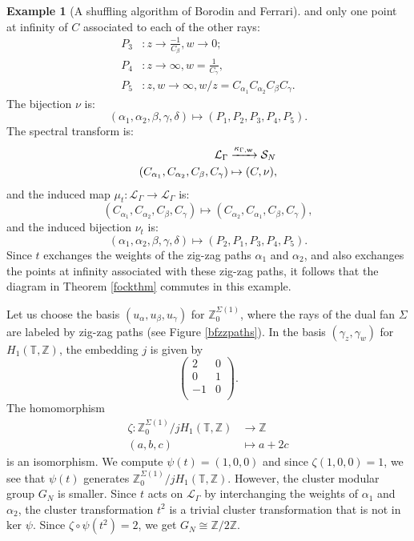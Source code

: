 \documentclass[11pt]{article} %
\theoremstyle{definition}
\newtheorem{example}[theorem]{Example}
\newcommand{\Z}{{\mathbb Z}}
\newcommand{\T}{{\mathbb T}}
\newcommand{\ra}{\rightarrow}
\begin{document}
\begin{example}[A shuffling algorithm of Borodin and Ferrari]
and only one point at infinity of $C$ associated to each of the other rays:
\begin{align*}
P_3 &: z \ra \frac{-1}{C_\beta}, w \ra 0;\\
P_4 &: z \ra \infty, w=\frac{1}{C_{\gamma}},\\
P_5 &: z,w \ra \infty, w/z=C_{\alpha_1} C_{\alpha_2} C_{\beta} C_\gamma.
\end{align*}
The bijection $\nu$ is:
$$
(\alpha_1,\alpha_2,\beta,\gamma,\delta) \mapsto (P_1,P_2,P_3,P_4,P_5).
$$
The spectral transform is:
\begin{align*}
    \mathcal L_\Gamma &\xrightarrow[]{\kappa_{\Gamma, {\bf w}}} \mathcal S_N\\
    (C_{\alpha_1}, C_{\alpha_2},C_\beta,C_\gamma) &\mapsto (C,\nu),
\end{align*}
and the induced map $\mu_t:\mathcal L_\Gamma \ra \mathcal L_\Gamma$ is:
$$
 (C_{\alpha_1}, C_{\alpha_2},C_\beta,C_\gamma) \mapsto (C_{\alpha_2}, C_{\alpha_1},C_\beta,C_\gamma),
$$
and the induced bijection $\nu_t$ is:
$$
(\alpha_1,\alpha_2,\beta,\gamma,\delta) \mapsto (P_2,P_1,P_3,P_4,P_5).
$$
Since $t$ exchanges the weights of the zig-zag paths $\alpha_1$ and $\alpha_2$, and also exchanges the points at infinity associated with these zig-zag paths, it follows that the diagram in Theorem \ref{fockthm} commutes in this example.

Let us choose the basis $(u_\alpha,u_\beta,u_\gamma)$ for $\Z^{\Sigma(1)}_0$, where the rays of the dual fan $\Sigma$ are labeled by zig-zag paths (see Figure \ref{bfzzpaths}). In the basis $(\gamma_z,\gamma_w)$ for $H_1(\T,\Z)$, the embedding $j$ is given by 
\[
\begin{pmatrix}
2&0\\
0&1 \\
-1&0\\
\end{pmatrix}.
\]
The homomorphism 
\begin{align*}
   \zeta: \Z^{\Sigma(1)}_0/j H_1(\T,\Z) &\ra \Z \nonumber \\
    (a,b,c) &\mapsto a+2c 
\end{align*}
is an isomorphism. We compute $\psi(t)=(1,0,0)$ and since $\zeta(1,0,0)=1$, we see that $\psi(t)$ generates $\Z^{\Sigma(1)}_0/j H_1(\T,\Z)$.
However, the cluster modular group $G_N$ is smaller. Since $t$ acts on $\mathcal L_\Gamma$ by interchanging the weights of $\alpha_1$ and $\alpha_2$, the cluster transformation $t^2$ is a trivial cluster transformation that is not in $\text{ker }\psi$. Since $\zeta \circ \psi(t^2)=2$, we get $G_N \cong \Z/2 \Z$. 
\end{example}
\end{document}
